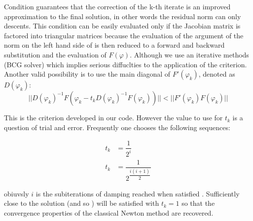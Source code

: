 Condition  guarantees that the correction of the k-th iterate is an improved approximation to the final solution, in other words the residual norm can only descents.
This condition can be easily evaluated only if the Jacobian matrix is factored into triangular matrices because the evaluation of the argument of the norm on the left hand side of  is then reduced to a forward and backward substitution and the evaluation of $F(\varphi)$. Although we use an iterative methods (BCG solver) which implies serious diffuclties to the application of the criterion. Another valid possibility is to use the main diagonal of $F'(\varphi_k)$, denoted as $D(\varphi_k)$:
\begin{equation}
\label{eq: easy criterion}
||D(\varphi_k)^{-1}F(\varphi_k-t_kD(\varphi_k)^{-1}F(\varphi_k))||<||F'(\varphi_k)F(\varphi_k)||
\end{equation}

This is the criterion developed in our code. However the value to use for $t_k$ is a question of trial and error. Frequently one chooses the following sequences:

\begin{align}
t_k & = \dfrac{1}{2^i} \\
t_k & = \dfrac{1}{2^{\dfrac{i(i+1)}{2}}}  
\end{align}

obiuvsly $i$ is the subiterations of damping reached when satisfied . Sufficiently close to the solution  (and so ) will be satisfied with $t_k=1$ so that the convergence properties of the classical Newton method are recovered.
 
